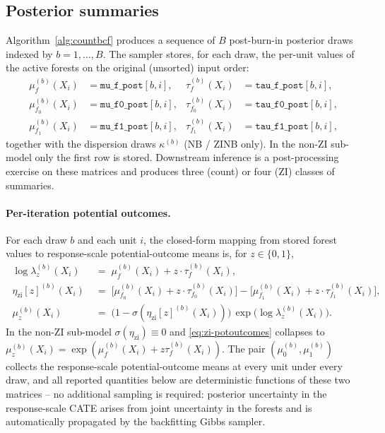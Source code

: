 \documentclass[11pt]{article}
\theoremstyle{plain}
\theoremstyle{definition}
\theoremstyle{remark}
\newcommand{\muF}{\mu_f}
\newcommand{\tauF}{\tau_f}
\newcommand{\muz}{\mu_{z}}
\newcommand{\muone}{\mu_{1}}
\newcommand{\muzero}{\mu_{0}}
\newcommand{\etazi}{\eta_{\mathrm{zi}}}
\newcommand{\muFzero}{\mu_{f_{0}}}
\newcommand{\muFone}{\mu_{f_{1}}}
\newcommand{\tauFzero}{\tau_{f_{0}}}
\newcommand{\tauFone}{\tau_{f_{1}}}
\begin{document}
\subsection{Posterior summaries}\label{sec:summaries}

Algorithm~\ref{alg:countbcf} produces a sequence of $B$ post-burn-in
posterior draws indexed by $b = 1, \dots, B$. The sampler stores, for
each draw, the per-unit values of the active forests on the original
(unsorted) input order:
\begin{equation}
  \begin{aligned}
    \muF^{(b)}(X_i) &= \texttt{mu\_f\_post}[b, i],
    & \tauF^{(b)}(X_i) &= \texttt{tau\_f\_post}[b, i], \\
    \muFzero^{(b)}(X_i) &= \texttt{mu\_f0\_post}[b, i],
    & \tauFzero^{(b)}(X_i) &= \texttt{tau\_f0\_post}[b, i], \\
    \muFone^{(b)}(X_i) &= \texttt{mu\_f1\_post}[b, i],
    & \tauFone^{(b)}(X_i) &= \texttt{tau\_f1\_post}[b, i],
  \end{aligned}
  \label{eq:zi-posterior-storage}
\end{equation}
together with the dispersion draws $\kappa^{(b)}$ (NB / ZINB only).
In the non-ZI sub-model only the first row is stored. Downstream
inference is a post-processing exercise on these matrices and
produces three (count) or four (ZI) classes of summaries.

\paragraph{Per-iteration potential outcomes.}
For each draw $b$ and each unit $i$, the closed-form mapping from
stored forest values to response-scale potential-outcome means is,
for $z \in \{0, 1\}$,
\begin{equation}
  \boxed{\;
    \begin{aligned}
      \log \lambda_z^{(b)}(X_i)
        &\;=\; \muF^{(b)}(X_i) + z \cdot \tauF^{(b)}(X_i), \\[2pt]
      \etazi[z]^{(b)}(X_i)
        &\;=\; \bigl[\muFzero^{(b)}(X_i) + z \cdot \tauFzero^{(b)}(X_i)\bigr]
              - \bigl[\muFone^{(b)}(X_i)  + z \cdot \tauFone^{(b)}(X_i)\bigr], \\[2pt]
      \muz^{(b)}(X_i)
        &\;=\; \bigl(1 - \sigma(\etazi[z]^{(b)}(X_i))\bigr) \,
              \exp\!\bigl(\log \lambda_z^{(b)}(X_i)\bigr).
    \end{aligned}
  \;}
  \label{eq:zi-potoutcomes}
\end{equation}
In the non-ZI sub-model $\sigma(\etazi) \equiv 0$ and
\eqref{eq:zi-potoutcomes} collapses to
$\muz^{(b)}(X_i) = \exp(\muF^{(b)}(X_i) + z \tauF^{(b)}(X_i))$. The
pair $(\muzero^{(b)}, \muone^{(b)})$ collects the response-scale
potential-outcome means at every unit under every draw, and all
reported quantities below are deterministic functions of these two
matrices -- no additional sampling is required: posterior uncertainty
in the response-scale CATE arises from joint uncertainty in the
forests and is automatically propagated by the backfitting Gibbs
sampler.
\end{document}
